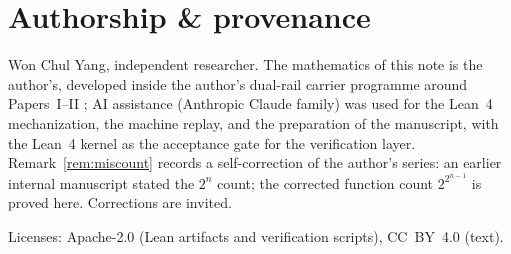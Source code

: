 \documentclass[11pt]{article}
\theoremstyle{remark}
\begin{document}
\section*{Authorship \& provenance}

Won Chul Yang, independent researcher. The mathematics of this note is
the author's, developed inside the author's dual-rail carrier programme
around Papers~I--II \cite{wcy1,wcy2}; AI assistance (Anthropic Claude
family) was used for the Lean~4 mechanization, the machine replay, and
the preparation of the manuscript, with the Lean~4 kernel as the
acceptance gate for the verification layer. Remark~\ref{rem:miscount}
records a self-correction of the author's series: an earlier internal
manuscript stated the $2^n$ count; the corrected function count
$2^{2^{n-1}}$ is proved here. Corrections are invited.

Licenses: Apache-2.0 (Lean artifacts and verification scripts),
CC~BY~4.0 (text).
\end{document}
